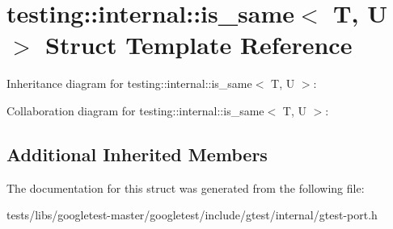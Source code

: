 \hypertarget{structtesting_1_1internal_1_1is__same}{}\section{testing\+:\+:internal\+:\+:is\+\_\+same$<$ T, U $>$ Struct Template Reference}
\label{structtesting_1_1internal_1_1is__same}


Inheritance diagram for testing\+:\+:internal\+:\+:is\+\_\+same$<$ T, U $>$\+:


Collaboration diagram for testing\+:\+:internal\+:\+:is\+\_\+same$<$ T, U $>$\+:
\subsection*{Additional Inherited Members}


The documentation for this struct was generated from the following file\+:\begin{DoxyCompactItemize}
\item 
tests/libs/googletest-\/master/googletest/include/gtest/internal/gtest-\/port.\+h\end{DoxyCompactItemize}
